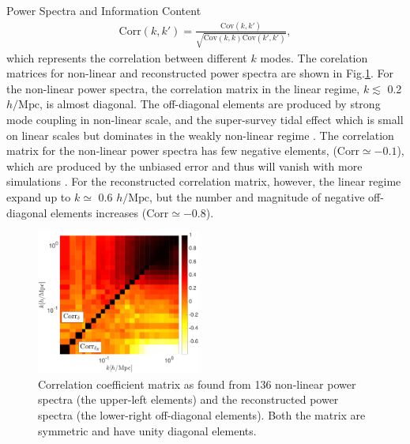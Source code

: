 \begin{section}{Power Spectra and Information Content}
\begin{align}
    \mathrm{Corr}\left(k,k'\right)=\frac{\mathrm{Cov}\left(k,k'\right)}{\sqrt{\mathrm{Cov}\left(k,k\right)\mathrm{Cov}\left(k',k'\right)}},
\end{align}
which represents the correlation between different $k$ modes. 
The corelation matrices for non-linear and reconstructed power spectra 
are shown in Fig.\ref{fig:corrall}. For the non-linear power spectra, the
correlation matrix in the linear regime, $k \lesssim$ 0.2 $h/\mathrm{Mpc}$, is almost diagonal. 
The off-diagonal elements are produced by 
strong mode coupling in non-linear scale, and the super-survey tidal effect which is small on 
linear scales but dominates in the weakly non-linear regime \cite{bib:Kazuyuki2016}.
The correlation matrix for the non-linear power spectra has few negative elements,
($\mathrm{Corr} \simeq -0.1$), which are produced by the unbiased error and thus 
 will vanish with more simulations \cite{bib:Takahashi2009}.
 For the reconstructed correlation matrix, however, the linear regime expand up to $k \simeq$ 0.6 $h/\mathrm{Mpc}$, 
but the number and magnitude of negative off-diagonal elements increases ($\mathrm{Corr} \simeq -0.8$). 

\begin{figure}
 \centering
  \includegraphics[width=0.48\textwidth]{corrmat_hot_2-crop.pdf}
  \caption{Correlation coefficient matrix as found from 136 non-linear power spectra 
(the upper-left elements) and the reconstructed power spectra (the lower-right off-diagonal elements). 
Both the matrix are symmetric and have unity diagonal elements.}
    \label{fig:corrall}
\end{figure}



\end{section}
